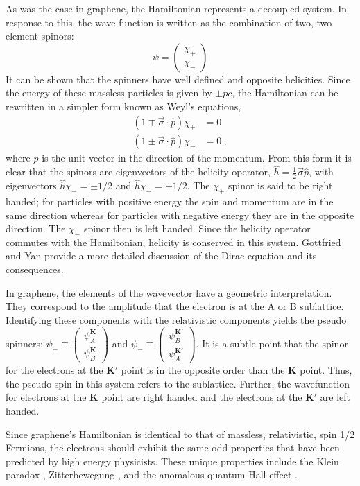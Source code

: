 As was the case in graphene, the Hamiltonian represents a decoupled system.
In response to this, the wave function is written as the combination of two, two element spinors:
\begin{equation*}
	\psi=\left( \begin{array}{c} \chi_{+} \\ \chi_{-} \end{array} \right)
\end{equation*}
It can be shown that the spinners have well defined and opposite helicities.
Since the energy of these massless particles is given by $\pm p c$, the Hamiltonian can be rewritten in a simpler form known as Weyl's equations,
\begin{align*}
	(1 \mp \vec{\sigma} \cdot \hat{p}) \chi_{+}&=0 \\
	(1 \pm \vec{\sigma} \cdot \hat{p}) \chi_{-}&=0 \ ,
\end{align*}
where $\hat{p}$ is the unit vector in the direction of the momentum.
From this form it is clear that the spinors are eigenvectors of the helicity operator, $\hat{h}=\frac{1}{2} \vec{\sigma} \hat{p}$, with eigenvectors $\hat{h} \chi_+=\pm 1/2$ and $\hat{h} \chi_-=\mp 1/2$.
The $\chi_+$ spinor is said to be right handed; for particles with positive energy the spin and momentum are in the same direction whereas for particles with negative energy they are in the opposite direction.
The $\chi_-$ spinor then is left handed.
Since the helicity operator commutes with the Hamiltonian, helicity is conserved in this system.
Gottfried and Yan provide a more detailed discussion of the Dirac equation and its consequences\cite{Gottfried2003}.

In graphene, the elements of the wavevector have a geometric interpretation.
They correspond to the amplitude that the electron is at the A or B sublattice.
Identifying these components with the relativistic components yields the pseudo spinners: $\psi_+ \equiv \left(\begin{array}{c} \psi_A^{\bm{K}} \\ \psi_B^{\bm{K}} \end{array} \right)$ and $\psi_- \equiv \left(\begin{array}{c} \psi_B^{\bm{K'}} \\ \psi_A^{\bm{K'}} \end{array} \right)$.
It is a subtle point that the spinor for the electrons at the $\bm{K'}$ point is in the opposite order than the $\bm{K}$ point.
Thus, the pseudo spin in this system refers to the sublattice.
Further, the wavefunction for electrons at the $\bm{K}$ point are right handed and the electrons at the $\bm{K'}$ are left handed.

Since graphene's Hamiltonian is identical to that of massless, relativistic, spin 1/2 Fermions, the electrons should exhibit the same odd properties that have been predicted by high energy physicists.
These unique properties include the Klein paradox \cite{Young2009}, Zitterbewegung \cite{CastroNeto2009}, and the anomalous quantum Hall effect \cite{Novoselov2005a,Zhang2005}.
